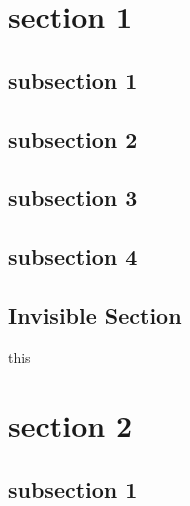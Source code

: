 \documentclass{beamer}
\makeatletter
\let\origaddtocontents=\addtocontents
\def\dontaddtocontents#1#2{} %
\makeatother
\begin{document}
\section{section 1}
\begin{frame}\end{frame}

\subsection{subsection 1}
\begin{frame}\end{frame}

\subsection{subsection 2}
\begin{frame}\end{frame}

\subsection{subsection 3}
\begin{frame}\end{frame}

\subsection{subsection 4}
\begin{frame}\end{frame}

\let\addtocontents=\dontaddtocontents
\subsection{Invisible Section}
\begin{frame}this\end{frame}
\let\addtocontents=\origaddtocontents

\section{section 2}
\begin{frame}\end{frame}

\subsection{subsection 1}
\begin{frame}\end{frame}
\end{document}
